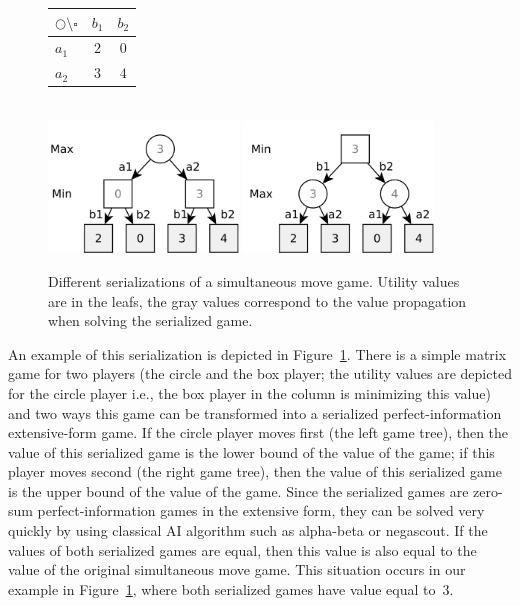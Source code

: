 \begin{figure}
\centering
\begin{tabular}{|l|c|c|}
\hline $\bigcirc \setminus \square$ & $b_1$ & $b_2$ \\
\hline $a_1$ & $2$ & $0$ \\
\hline $a_2$ & $3$ & $4$ \\
\hline
\end{tabular}\\\vspace{0.5cm}
\includegraphics[width=0.45\textwidth]{figures/serialization1.pdf}
\includegraphics[width=0.45\textwidth]{figures/serialization2.pdf}
\caption{Different serializations of a simultaneous move game. Utility values are in the leafs, the gray values correspond to the value propagation when solving the serialized game.}\label{fig:serialization}
\end{figure}

An example of this serialization is depicted in Figure~\ref{fig:serialization}. 
There is a simple matrix game for two players (the circle and the box player; the utility values are depicted for the circle player i.e., the box player in the column is minimizing this value) and two ways this game can be transformed into a serialized perfect-information extensive-form game.
If the circle player moves first (the left game tree), then the value of this serialized game is the lower bound of the value of the game; if this player moves second (the right game tree), then the value of this serialized game is the upper bound of the value of the game.
Since the serialized games are zero-sum perfect-information games in the extensive form, they can be solved very quickly by using classical AI algorithm such as alpha-beta or negascout.
If the values of both serialized games are equal, then this value is also equal to the value of the original simultaneous move game. 
This situation occurs in our example in Figure~\ref{fig:serialization}, where both serialized games have value equal to~$3$.

